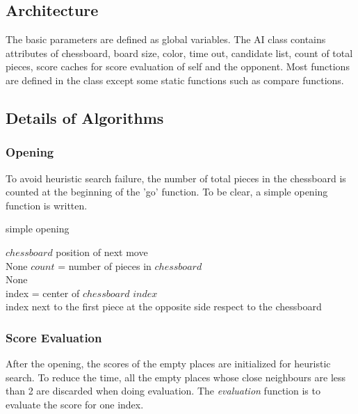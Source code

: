 \documentclass[conference,compsoc]{IEEEtran}
\renewcommand{\algorithmicrequire}{\textbf{Input:}}
\renewcommand{\algorithmicensure}{\textbf{Output:}}
\begin{document}
\subsection{Architecture}
The basic parameters are defined as global variables. The AI class contains attributes of chessboard, board size, color, time out, candidate list, count of total pieces, score caches for score evaluation of self and the opponent. Most functions are defined in the class except some static functions such as compare functions.

\subsection{Details of Algorithms}
\subsubsection{Opening}
To avoid heuristic search failure, the number of total pieces in the chessboard is counted at the beginning of the 'go' function. To be clear, a simple opening function is written.  

\begin{algorithm}
 \caption{simple opening}
 \begin{algorithmic}[h]
 \renewcommand{\algorithmicrequire}{\textbf{Input:}}
 \renewcommand{\algorithmicensure}{\textbf{Output:}}
 \REQUIRE $chessboard$
 \ENSURE  position of next move\\ 
  \RETURN None
  \ENDIF
  \STATE $count$ = number of pieces in $chessboard$ \\
  \RETURN None
  \ENDIF \\
  \STATE index = center of $chessboard$
  \RETURN $index$
  \ENDIF \\
  \RETURN index next to the first piece at the opposite side respect to the chessboard
 \end{algorithmic} 
 \end{algorithm}
\subsubsection{Score Evaluation}
After the opening, the scores of the empty places are initialized for heuristic search. To reduce the time, all the empty places whose close neighbours are less than 2 are discarded when doing evaluation. The \textit{evaluation} function is to evaluate the score for one index.
\end{document}
